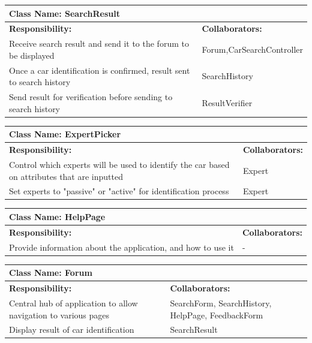 \documentclass[12pt]{article}
\begin{document}
	\begin{table}[ht]
		\centering
		\begin{tabular}{|p{5cm}|p{5cm}|}
		\hline 
		 \multicolumn{2}{|l|}{\textbf{Class Name:} SearchResult} \\
		\hline
		\textbf{Responsibility:} & \textbf{Collaborators:} \\
		\hline
		Receive search result and send it to the forum to be displayed  & Forum,CarSearchController\\
		\hline
		Once a car identification is confirmed, result sent to search history & SearchHistory\\
		\hline
		Send result for verification before sending to search history & ResultVerifier\\
		\hline
		\end{tabular}
	\end{table}

	\begin{table}[ht]
		\centering
		\begin{tabular}{|p{5cm}|p{5cm}|}
		\hline 
		 \multicolumn{2}{|l|}{\textbf{Class Name:} ExpertPicker} \\
		\hline
		\textbf{Responsibility:} & \textbf{Collaborators:} \\
		\hline
		Control which experts will be used to identify the car based on attributes that are inputted & Expert\\
		\hline
		Set experts to "passive" or "active" for identification process & Expert\\
		\hline
		\end{tabular}
	\end{table}
	
	\begin{table}[ht]
		\centering
		\begin{tabular}{|p{5cm}|p{5cm}|}
			\hline 
			\multicolumn{2}{|l|}{\textbf{Class Name:} HelpPage} \\
			\hline
			\textbf{Responsibility:} & \textbf{Collaborators:} \\
			\hline
			Provide information about the application, and how to use it & -\\
			\hline
		\end{tabular}
	\end{table}

	\begin{table}[ht]
		\centering
		\begin{tabular}{|p{5cm}|p{5cm}|}
			\hline 
			\multicolumn{2}{|l|}{\textbf{Class Name:} Forum} \\
			\hline
			\textbf{Responsibility:} & \textbf{Collaborators:} \\
			\hline
			Central hub of application to allow navigation to various pages & SearchForm, SearchHistory, HelpPage, FeedbackForm\\
			\hline
			Display result of car identification & SearchResult\\
			\hline
		\end{tabular}
	\end{table}
	
\end{document}
